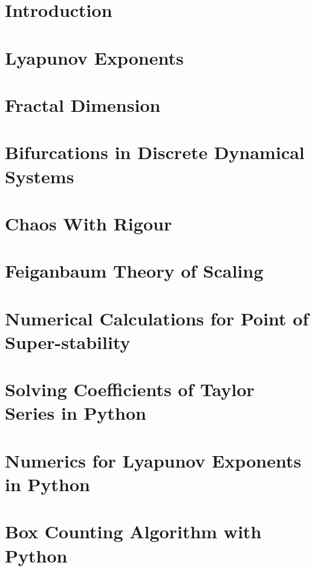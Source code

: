 \documentclass[12pt,oneside]{report}
\begin{document}
\maketitle

\declaration
\dedication{Musa mihi causas memora ...\\
	Muse, tell me the cause ...
}

\tableofcontents

\chapter{Introduction}

% 
\chapter{Lyapunov Exponents}

\chapter{Fractal Dimension}


\chapter{Bifurcations in Discrete Dynamical Systems}


\chapter{Chaos With Rigour}


\chapter{Feiganbaum Theory of Scaling}


\begin{appendices}
	\chapter{Numerical Calculations for Point of Super-stability}
	
    \chapter{Solving Coefficients of Taylor Series in Python}
	
    \chapter{Numerics for Lyapunov Exponents in Python}
    
    \chapter{Box Counting Algorithm with Python}
    
\end{appendices}

%  
\printbibliography
{}
\end{document}
